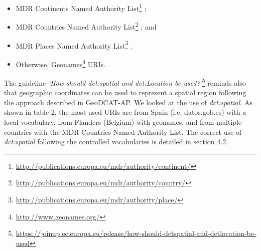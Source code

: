 \documentclass[<options>]{elsarticle}
\begin{document}
\begin{itemize}
\item MDR Continents Named Authority List\footnote{\href{  http://publications.europa.eu/mdr/authority/continent/}{  http://publications.europa.eu/mdr/authority/continent/}} ;
\item MDR Countries Named Authority List\footnote{\href{  http://publications.europa.eu/mdr/authority/country/}{  http://publications.europa.eu/mdr/authority/country/}} ; and
\item MDR Places Named Authority List\footnote{\href{  http://publications.europa.eu/mdr/authority/place/}{  http://publications.europa.eu/mdr/authority/place/}} .
\item Otherwise, Geonames\footnote{\href{  http://www.geonames.org/}{  http://www.geonames.org/}} URIs.
\end{itemize}

The guideline \textit{‘How should dct:spatial and dct:Location be used?’}\footnote{\href{  https://joinup.ec.europa.eu/release/how-should-dctspatial-and-dctlocation-be-used}{  https://joinup.ec.europa.eu/release/how-should-dctspatial-and-dctlocation-be-used}} reminds also that geographic coordinates can be used to represent a spatial region following the approach described in GeoDCAT-AP. We looked at the use of \textit{dct:spatial}. As shown in table 2, the most used URIs are from Spain (i.e. datos.gob.es) with a local vocabulary, from Flanders (Belgium) with geonames, and from multiple countries with the MDR Countries Named Authority List. The correct use of \textit{dct:spatial} following the controlled vocabularies is detailed in section 4.2. 
\end{document}
